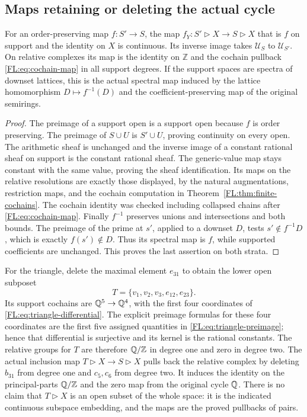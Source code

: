 \subsection{Maps retaining or deleting the actual cycle}

\begin{proposition}
\label{FL:prop:support-morphisms}
For an order-preserving map $f:S'\to S$, the map
$f_Y:S'\triangleright X\to S\triangleright X$ that is $f$ on support
and the identity on $X$ is continuous. Its inverse image takes
$\mathcal U_S$ to $\mathcal U_{S'}$. On relative complexes its map is
the identity on $\mathbb Z$ and the cochain pullback
\eqref{FL:eq:cochain-map} in all support degrees. If the support spaces
are spectra of downset lattices, this is the actual spectral map
induced by the lattice homomorphism $D\mapsto f^{-1}(D)$ and the
coefficient-preserving map of the original semirings.
\end{proposition}
\begin{proof}
The preimage of a support open is a support open because $f$ is
order preserving. The preimage of $S\cup U$ is $S'\cup U$, proving
continuity on every open. The arithmetic sheaf is unchanged and
the inverse image of a constant rational sheaf on support is the
constant rational sheaf. The generic-value map stays constant with
the same value, proving the sheaf identification. Its maps on the
relative resolutions are exactly those displayed, by the natural
augmentations, restriction maps, and the cochain computation in
Theorem~\ref{FL:thm:finite-cochains}. The cochain identity was checked
including collapsed chains after \eqref{FL:eq:cochain-map}.
Finally $f^{-1}$ preserves unions and intersections and both bounds.
The preimage of the prime at $s'$, applied to a downset $D$, tests
$s'\notin f^{-1}D$, which is exactly $f(s')\notin D$. Thus its
spectral map is $f$, while supported coefficients are unchanged.
This proves the last assertion on both strata.
\end{proof}

For the triangle, delete the maximal element $e_{31}$ to obtain the
lower open subposet
\[
 T=\{v_1,v_2,v_3,e_{12},e_{23}\}.
\]
Its support cochains are $\mathbb Q^5\to\mathbb Q^4$, with the first four
coordinates of \eqref{FL:eq:triangle-differential}. The explicit
preimage formulas for these four coordinates are the first five
assigned quantities in \eqref{FL:eq:triangle-preimage}; hence that
differential is surjective and its kernel is the rational constants.
The relative groups for $T$ are therefore $\mathbb Q/\mathbb Z$ in degree
one and zero in degree two. The actual inclusion map
$T\triangleright X\to S\triangleright X$ pulls back the relative
complex by deleting $b_{31}$ from degree one and $c_5,c_6$ from
degree two. It induces the identity on the principal-parts
$\mathbb Q/\mathbb Z$ and the zero map from the original cycle $\mathbb Q$.
There is no claim that $T\triangleright X$ is an open subset of the
whole space: it is the indicated continuous subspace embedding,
and the maps are the proved pullbacks of pairs.

